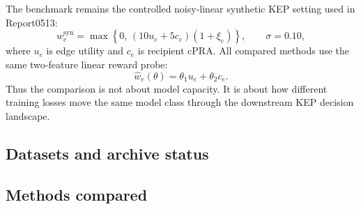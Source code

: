 \documentclass[11pt]{article}
\begin{document}
The benchmark remains the controlled noisy-linear synthetic KEP setting used in
Report0513:
\[
    w^{\mathrm{syn}}_e
    =
    \max\left\{0,\,(10u_e + 5c_e)(1+\xi_e)\right\},
    \qquad \sigma=0.10,
\]
where \(u_e\) is edge utility and \(c_e\) is recipient cPRA. All compared methods
use the same two-feature linear reward probe:
\[
    \hat w_e(\theta)=\theta_1 u_e + \theta_2 c_e .
\]
Thus the comparison is not about model capacity. It is about how different
training losses move the same model class through the downstream KEP decision
landscape.

\subsection{Datasets and archive status}

\begin{table}[H]
\centering
\caption{Datasets and result archives used for Report0520.}
\label{tab:dataset-archive-status}
\end{table}

\subsection{Methods compared}
\end{document}
